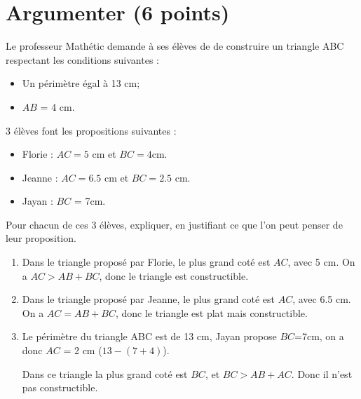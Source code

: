 \section{Argumenter (6 points)}

Le professeur Mathétic demande à ses élèves de  de construire un triangle ABC respectant les conditions suivantes :

\begin{itemize}
	\item Un périmètre égal à 13 cm;
	\item $AB$ = 4 cm.
\end{itemize}

3 élèves font les propositions suivantes :
\begin{itemize}
	\item Florie : $AC = 5$ cm et $BC= \num{4}$cm.
	\item Jeanne :  $AC = \num{6.5}$ cm et $BC= \num{2.5}$ cm.
	\item Jayan : $BC$ = 7cm.
\end{itemize}

\begin{questions}
	\question[6] Pour chacun de ces 3 élèves, expliquer, en justifiant ce que l'on peut penser de leur proposition.
	
	\begin{solution}
		\begin{enumerate}
			\item Dans le triangle proposé par Florie, le plus grand coté est $AC$, avec 5 cm. On a $AC > AB + BC$, donc le triangle est constructible.
			
			\item Dans le triangle proposé par Jeanne, le plus grand coté est $AC$, avec \num{6.5} cm. On a $AC = AB + BC$, donc le triangle est plat mais constructible.
			
			\item Le périmètre du triangle ABC est de 13 cm, Jayan propose $BC$=7cm, on a donc $AC$ = 2 cm ($13 - (7 + 4)$).
			
			Dans ce triangle la plus grand coté est $BC$, et $BC > AB + AC$. Donc il n'est pas constructible.
		\end{enumerate}
	\end{solution}
\end{questions}